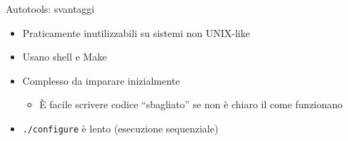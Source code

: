 \documentclass[xetex,table]{beamer}
\begin{document}
\begin{frame}{Autotools: svantaggi}
  \begin{itemize}
  \item Praticamente inutilizzabili su sistemi non UNIX-like
  \item Usano shell e Make
  \item Complesso da imparare inizialmente
    \begin{itemize}
    \item È facile scrivere codice ``sbagliato'' se non è chiaro il
      come funzionano
    \end{itemize}
  \item \texttt{./configure} è lento (esecuzione sequenziale)
  \end{itemize}
\end{frame}
\end{document}

